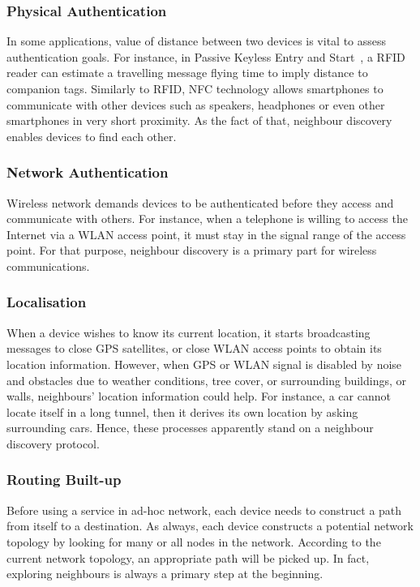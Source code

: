 \subsubsection*{Physical Authentication}

In some applications, value of distance between two devices is vital to assess authentication goals. For instance, in Passive Keyless Entry and Start~\cite{waraksa1990passive}, a RFID reader can estimate a travelling message flying time to imply distance to companion tags. Similarly to RFID, NFC technology allows smartphones to communicate with other devices such as speakers, headphones or even other smartphones in very short proximity. As the fact of that, neighbour discovery enables devices to find each other. 

\subsubsection*{Network Authentication}
Wireless network demands devices to be authenticated before they access and communicate with others. For instance, when a telephone is willing to access the Internet via a WLAN access point, it must stay in the signal range of the access point. For that purpose, neighbour discovery is a primary part for wireless communications. 

\subsubsection*{Localisation}

When a device wishes to know its current location, it starts broadcasting messages to close GPS satellites, or close WLAN access points to obtain its location information. However, when GPS or WLAN signal is disabled by noise and obstacles due to weather conditions, tree cover, or surrounding buildings, or walls, neighbours' location information could help. For instance, a car cannot locate itself in a long tunnel, then it derives its own location by asking surrounding cars. Hence, these processes apparently stand on a neighbour discovery protocol.

\subsubsection*{Routing Built-up}

Before using a service in ad-hoc network, each device needs to construct a path from itself to a destination. As always, each device constructs a potential network topology by looking for many or all nodes in the network. According to the current network topology, an appropriate path will be picked up. In fact, exploring neighbours is always a primary step at the beginning. 

